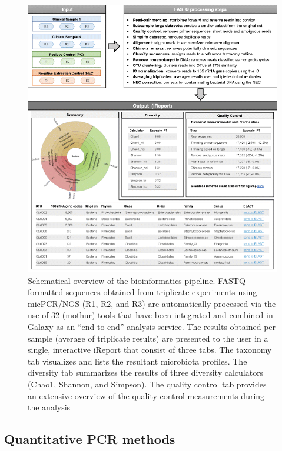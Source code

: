 \begin{figure}[t!]
\centering
\includegraphics[scale=0.5]{chapters/images/mycrobiota/mycrobiota-fig1.png}
\caption{Schematical overview of the bioinformatics pipeline. FASTQ-formatted sequences obtained from triplicate experiments using micPCR/NGS (R1, R2, and R3) are automatically processed via the use of 32 (mothur) tools that have been integrated and combined in Galaxy as an “end-to-end” analysis service. The results obtained per sample (average of triplicate results) are presented to the user in a single, interactive iReport that consist of three tabs. The taxonomy tab visualizes and lists the resultant microbiota profiles. The diversity tab summarizes the results of three diversity calculators (Chao1, Shannon, and Simpson). The quality control tab provides an extensive overview of the quality control measurements during the analysis}\label{fig:mycrobiota-pipeline}
\end{figure}


\subsection*{Quantitative PCR methods}

